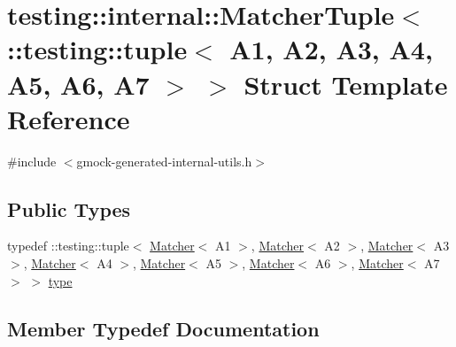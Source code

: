 \hypertarget{structtesting_1_1internal_1_1_matcher_tuple_3_01_1_1testing_1_1tuple_3_01_a1_00_01_a2_00_01_a3_0064798126035aa0d3ca935c3449bf0c1}{}\section{testing\+::internal\+::Matcher\+Tuple$<$ \+::testing\+::tuple$<$ A1, A2, A3, A4, A5, A6, A7 $>$ $>$ Struct Template Reference}
\label{structtesting_1_1internal_1_1_matcher_tuple_3_01_1_1testing_1_1tuple_3_01_a1_00_01_a2_00_01_a3_0064798126035aa0d3ca935c3449bf0c1}


{\ttfamily \#include $<$gmock-\/generated-\/internal-\/utils.\+h$>$}

\subsection*{Public Types}
\begin{DoxyCompactItemize}
\item 
typedef \+::testing\+::tuple$<$ \mbox{\hyperlink{classtesting_1_1_matcher}{Matcher}}$<$ A1 $>$, \mbox{\hyperlink{classtesting_1_1_matcher}{Matcher}}$<$ A2 $>$, \mbox{\hyperlink{classtesting_1_1_matcher}{Matcher}}$<$ A3 $>$, \mbox{\hyperlink{classtesting_1_1_matcher}{Matcher}}$<$ A4 $>$, \mbox{\hyperlink{classtesting_1_1_matcher}{Matcher}}$<$ A5 $>$, \mbox{\hyperlink{classtesting_1_1_matcher}{Matcher}}$<$ A6 $>$, \mbox{\hyperlink{classtesting_1_1_matcher}{Matcher}}$<$ A7 $>$ $>$ \mbox{\hyperlink{structtesting_1_1internal_1_1_matcher_tuple_3_01_1_1testing_1_1tuple_3_01_a1_00_01_a2_00_01_a3_0064798126035aa0d3ca935c3449bf0c1_a733b8ef9996b7f465e9018393bec5cc4}{type}}
\end{DoxyCompactItemize}


\subsection{Member Typedef Documentation}
\mbox{\label{structtesting_1_1internal_1_1_matcher_tuple_3_01_1_1testing_1_1tuple_3_01_a1_00_01_a2_00_01_a3_0064798126035aa0d3ca935c3449bf0c1_a733b8ef9996b7f465e9018393bec5cc4}} 

